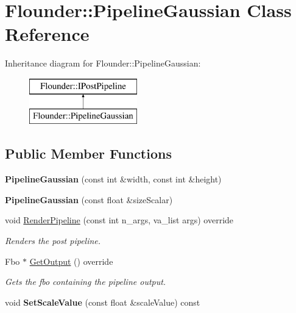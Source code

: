 \hypertarget{class_flounder_1_1_pipeline_gaussian}{}\section{Flounder\+:\+:Pipeline\+Gaussian Class Reference}
\label{class_flounder_1_1_pipeline_gaussian}
Inheritance diagram for Flounder\+:\+:Pipeline\+Gaussian\+:\begin{figure}[H]
\begin{center}
\leavevmode
\includegraphics[height=2.000000cm]{class_flounder_1_1_pipeline_gaussian}
\end{center}
\end{figure}
\subsection*{Public Member Functions}
\begin{DoxyCompactItemize}
\item 
\mbox{\label{class_flounder_1_1_pipeline_gaussian_acb989986746d59bd9384529849b822b6}} 
{\bfseries Pipeline\+Gaussian} (const int \&width, const int \&height)
\item 
\mbox{\label{class_flounder_1_1_pipeline_gaussian_af89101d745f779bb254c8fe8fc2b0920}} 
{\bfseries Pipeline\+Gaussian} (const float \&size\+Scalar)
\item 
void \hyperlink{class_flounder_1_1_pipeline_gaussian_a5187cbc15a4a56cef0ca227628a0f83f}{Render\+Pipeline} (const int n\+\_\+args, va\+\_\+list args) override
\begin{DoxyCompactList}\small\item\em Renders the post pipeline. \end{DoxyCompactList}\item 
Fbo $\ast$ \hyperlink{class_flounder_1_1_pipeline_gaussian_aafe2b02eac20f2d16dede6df39c21864}{Get\+Output} () override
\begin{DoxyCompactList}\small\item\em Gets the fbo containing the pipeline output. \end{DoxyCompactList}\item 
\mbox{\label{class_flounder_1_1_pipeline_gaussian_a0904999888d4101741930061e964f375}} 
void {\bfseries Set\+Scale\+Value} (const float \&scale\+Value) const
\end{DoxyCompactItemize}

